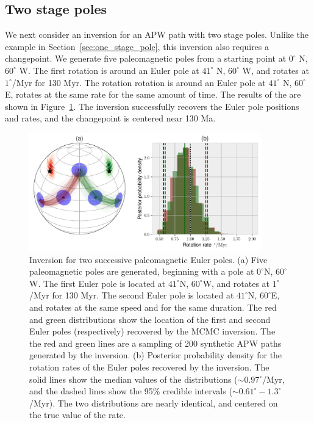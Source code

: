 \documentclass[preprint,12pt,authoryear]{elsarticle}
\begin{document}
\subsection{Two stage poles}
\label{sec:two_stage_poles}
We next consider an inversion for an APW path with two stage poles.
Unlike the example in Section~\ref{sec:one_stage_pole}, this inversion also requires a changepoint.
We generate five paleomagnetic poles from a starting point at $0^\circ$ N, $60^\circ$ W.
The first rotation is around an Euler pole at $41^\circ$ N, $60^\circ$ W, and rotates at $1^\circ$/Myr for 130 Myr.
The rotation rotation is around an Euler pole at $41^\circ$ N, $60^\circ$ E, rotates at the same rate for the same amount of time.
The results of the are shown in Figure~\ref{fig:two_euler_poles}.
The inversion successfully recovers the Euler pole positions and rates, and the changepoint is centered near 130 Ma.
\begin{figure}
\includegraphics[width=0.9\textwidth]{figures/synthetic/two_euler_poles.pdf}
\caption[Inversion for two successive paleomagnetic Euler poles.]{Inversion for two successive paleomagnetic Euler poles. (a) Five paleomagnetic poles are generated, beginning with a pole at $0^\circ$N, $60^\circ$W. The first Euler pole is located at $41^\circ$N, $60^\circ$W, and rotates at $1^\circ$/Myr for 130 Myr. The second Euler pole is located at $41^\circ$N, $60^\circ$E, and rotates at the same speed and for the same duration. The red and green distributions show the location of the first and second Euler poles (respectively) recovered by the MCMC inversion. The the red and green lines are a sampling of 200 synthetic APW paths generated by the inversion. (b) Posterior probability density for the rotation rates of the Euler poles recovered by the inversion. The solid lines show the median values of the distributions ($\sim 0.97^\circ$/Myr, and the dashed lines show the 95\% credible intervals ($\sim 0.61^\circ-1.3^\circ$/Myr). The two distributions are nearly identical, and centered on the true value of the rate.}
\label{fig:two_euler_poles}
\end{figure}
\end{document}
